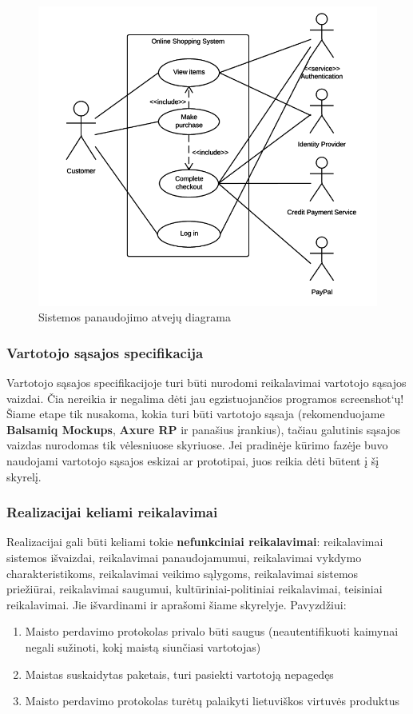 \documentclass{ktuthesis}
\begin{document}
  \begin{figure}[htbp!]
    \includegraphics[width=11.22cm]{images/usecasediagram.png}
    \caption{Sistemos panaudojimo atvejų diagrama}
  \end{figure}

  \subsubsection{Vartotojo sąsajos specifikacija}

  Vartotojo sąsajos specifikacijoje turi būti nurodomi reikalavimai vartotojo sąsajos vaizdai. Čia nereikia ir negalima dėti jau egzistuojančios programos screenshot‘ų!
  Šiame etape tik nusakoma, kokia turi būti vartotojo sąsaja (rekomenduojame \textbf{Balsamiq Mockups}, \textbf{Axure RP} ir panašius įrankius), tačiau galutinis sąsajos vaizdas
  nurodomas tik vėlesniuose skyriuose. Jei pradinėje kūrimo fazėje buvo naudojami vartotojo sąsajos eskizai ar prototipai, juos reikia dėti būtent į šį skyrelį.

  \subsubsection{Realizacijai keliami reikalavimai}

  Realizacijai gali būti keliami tokie \textbf{nefunkciniai reikalavimai}: reikalavimai sistemos išvaizdai, reikalavimai panaudojamumui, reikalavimai vykdymo charakteristikoms,
  reikalavimai veikimo sąlygoms, reikalavimai sistemos priežiūrai, reikalavimai saugumui, kultūriniai-politiniai reikalavimai, teisiniai reikalavimai. Jie išvardinami
  ir aprašomi šiame skyrelyje. Pavyzdžiui:
  \begin{enumerate}
    \item Maisto perdavimo protokolas privalo būti saugus (neautentifikuoti kaimynai negali sužinoti, kokį maistą siunčiasi vartotojas)
    \item Maistas suskaidytas paketais, turi pasiekti vartotoją nepagedęs
    \item Maisto perdavimo protokolas turėtų palaikyti lietuviškos virtuvės produktus
  \end{enumerate}
\end{document}

